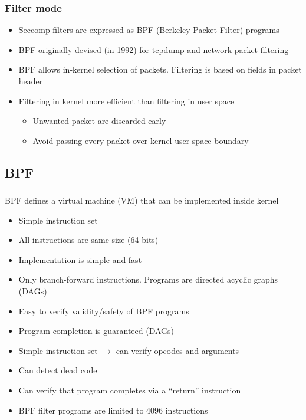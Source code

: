 \documentclass[usenames,dvipsnames]{beamer}
\begin{document}
\begin{frame}
\frametitle{Filter mode}
\begin{itemize}
\item Seccomp filters are expressed as BPF (Berkeley Packet Filter) programs
\item BPF originally devised (in 1992) for tcpdump and network packet filtering
\item BPF allows in-kernel selection of packets. Filtering is based on fields in packet header
\item Filtering in kernel more efficient than filtering in user space
  \begin{itemize}
    \item Unwanted packet are discarded early
    \item Avoid passing every packet over kernel-user-space boundary
  \end{itemize}
\end{itemize}
\end{frame}

\subsection{BPF}
\begin{frame}
\frametitle{\subsecname}
\small
BPF defines a virtual machine (VM) that can be implemented inside kernel
\begin{itemize}
  \item Simple instruction set
  \item All instructions are same size (64 bits)
  \item Implementation is simple and fast
  \item Only branch-forward instructions. Programs are directed acyclic graphs (DAGs)
  \item Easy to verify validity/safety of BPF programs
  \item Program completion is guaranteed (DAGs)
  \item Simple instruction set $\rightarrow$ can verify opcodes and arguments
  \item Can detect dead code
  \item Can verify that program completes via a “return” instruction
  \item BPF filter programs are limited to 4096 instructions
\end{itemize}
\end{frame}
\end{document}
